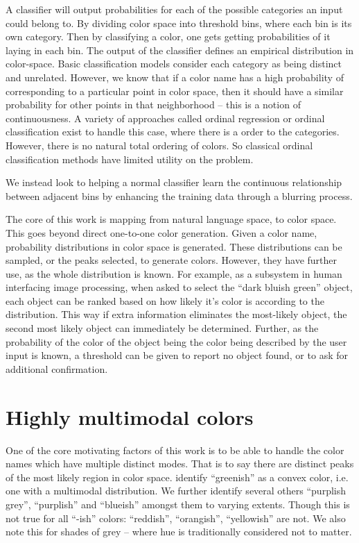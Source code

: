 \documentclass[11pt,letterpaper]{article}
\newcommand{\textcite}{\newcite}
\begin{document}
A classifier will output probabilities for each of the possible categories an input could belong to.
By dividing color space into threshold bins, where each bin is its own category.
Then by classifying a color, one gets getting probabilities of it laying in each bin. The output of the classifier defines an empirical distribution in color-space.
Basic classification models consider each category as being distinct and unrelated.
However, we know that if a color name has a high probability of corresponding to a particular point in color space, then it should have a similar probability for other points in that neighborhood -- this is a notion of continuousness.
A variety of approaches called ordinal regression or ordinal classification exist to handle this case, where there is a order to the categories.
However, there is no natural total ordering of colors.
So classical ordinal classification methods have limited utility on the problem.

We instead look to helping a normal classifier learn the continuous relationship between adjacent bins by enhancing the training data through a blurring process.

The core of this work is mapping from natural language space, to color space.
This goes beyond direct one-to-one color generation.
Given a color name, probability distributions in color space is generated.
These distributions can be sampled, or the peaks selected, to generate colors.
However, they have further use, as the whole distribution is known.
For example, as a subsystem in human interfacing image processing, when asked to select the ``dark bluish green'' object, each object can be ranked based on how likely it's color is according to the distribution.
This way if extra information eliminates the most-likely object, the second most likely object can immediately be determined.
Further, as the probability of the color of the object being the color being described by the user input is known, a threshold can be given to report no object found, or to ask for additional confirmation.



\section{Highly multimodal colors}\label{sec:highly-multimodal-colors}
One of the core motivating factors of this work is to be able to handle the color names which have multiple distinct modes.
That is to say there are distinct peaks of the most likely region in color space.
\textcite{mcmahan2015bayesian} identify ``greenish'' as a convex color, i.e. one with a multimodal distribution.
We further identify several others ``purplish grey'', ``purplish'' and ``blueish'' amongst them to varying extents.
Though this is not true for all ``-ish'' colors: ``reddish'', ``orangish'', ``yellowish'' are not.
We also note this for shades of grey -- where hue is traditionally considered not to matter.
\end{document}
